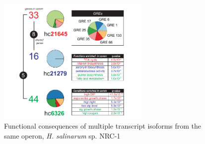 \documentclass{article}
\newcommand{\halo}{{\emph{H. salinarum} sp. NRC-1 }}
\begin{document}
\begin{figure}[h!]
    \centering
    \includegraphics[width=0.65\textwidth]{figures/egrin2_dpp_2}
 	\caption[Functional consequences of multiple transcript isoforms from the same operon, \halo]{Functional consequences of multiple transcript isoforms from the same operon, \halo}
    \label{fig:egrin2:3:B}
\end{figure}


\end{document}
